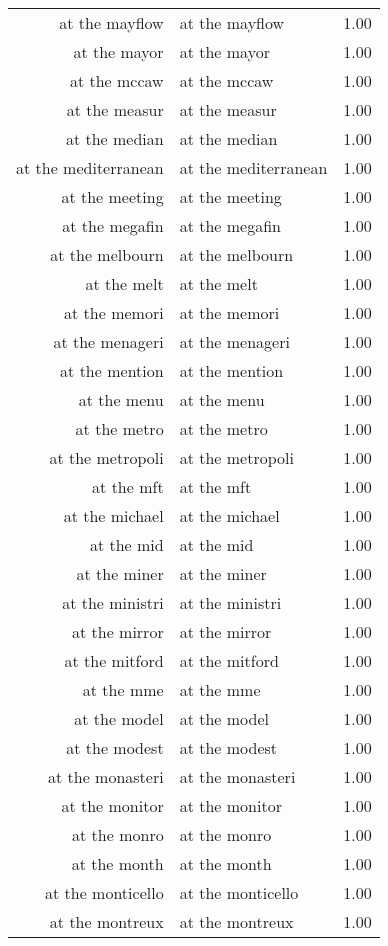 \begin{table}[ht]
\begin{tabular}{rlr}
  at the mayflow & at the mayflow & 1.00 \\ 
  at the mayor & at the mayor & 1.00 \\ 
  at the mccaw & at the mccaw & 1.00 \\ 
  at the measur & at the measur & 1.00 \\ 
  at the median & at the median & 1.00 \\ 
  at the mediterranean & at the mediterranean & 1.00 \\ 
  at the meeting & at the meeting & 1.00 \\ 
  at the megafin & at the megafin & 1.00 \\ 
  at the melbourn & at the melbourn & 1.00 \\ 
  at the melt & at the melt & 1.00 \\ 
  at the memori & at the memori & 1.00 \\ 
  at the menageri & at the menageri & 1.00 \\ 
  at the mention & at the mention & 1.00 \\ 
  at the menu & at the menu & 1.00 \\ 
  at the metro & at the metro & 1.00 \\ 
  at the metropoli & at the metropoli & 1.00 \\ 
  at the mft & at the mft & 1.00 \\ 
  at the michael & at the michael & 1.00 \\ 
  at the mid & at the mid & 1.00 \\ 
  at the miner & at the miner & 1.00 \\ 
  at the ministri & at the ministri & 1.00 \\ 
  at the mirror & at the mirror & 1.00 \\ 
  at the mitford & at the mitford & 1.00 \\ 
  at the mme & at the mme & 1.00 \\ 
  at the model & at the model & 1.00 \\ 
  at the modest & at the modest & 1.00 \\ 
  at the monasteri & at the monasteri & 1.00 \\ 
  at the monitor & at the monitor & 1.00 \\ 
  at the monro & at the monro & 1.00 \\ 
  at the month & at the month & 1.00 \\ 
  at the monticello & at the monticello & 1.00 \\ 
  at the montreux & at the montreux & 1.00 \\ 

\end{tabular}
\end{table}
